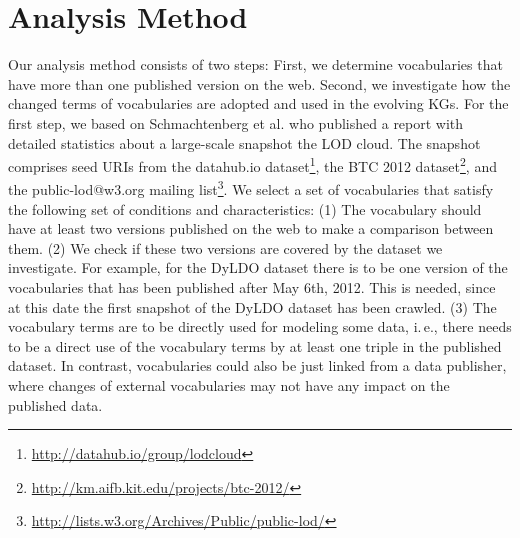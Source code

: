 \section{Analysis Method}
\label{Meth}
Our analysis method consists of two steps:
First, we determine vocabularies that have more than one published version on the web.
Second, we investigate how the changed terms of vocabularies are adopted and used in the evolving KGs.
%
For the first step, we based on Schmachtenberg et al. \cite{schmachtenberg2014adoption} who published a report with detailed statistics about a large-scale snapshot the LOD cloud. 
The snapshot comprises seed URIs from the datahub.io dataset\footnote{\url{http://datahub.io/group/lodcloud}}, the BTC 2012 dataset\footnote{\url{http://km.aifb.kit.edu/projects/btc-2012/}}, and the public-lod@w3.org mailing list\footnote{\url{http://lists.w3.org/Archives/Public/public-lod/}}.
We select a set of vocabularies that satisfy the following set of conditions and characteristics:
	(1) The vocabulary should have at least two versions published on the web to make a comparison between them.
	(2) We check if these two versions are covered by the dataset we investigate.
	For example, for the DyLDO dataset there is to be one version of the vocabularies that has been published after May 6th, 2012.
	This is needed, since at this date the first snapshot of the DyLDO dataset has been crawled. 
	(3) The vocabulary terms are to be directly used for modeling some data, i.\,e., there needs to be a direct use of the vocabulary terms by at least one triple in the published dataset.
	In contrast, vocabularies could also be just linked from a data publisher, where changes of external vocabularies may not have any impact on the published data.

